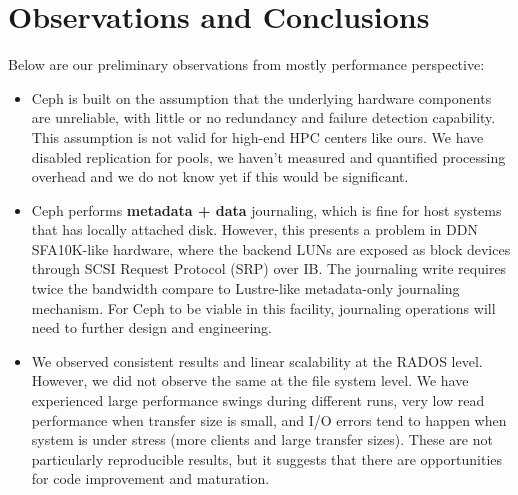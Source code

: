 \section{Observations and Conclusions}

Below are our preliminary observations from mostly performance perspective:

\begin{itemize}

  \item Ceph is built on the assumption that the underlying hardware components
are unreliable, with little or no redundancy and failure detection capability.
This assumption is not valid for high-end HPC centers like ours. We have
disabled replication for pools, we haven't measured and quantified
processing overhead and we do not know yet if this would be significant.

  \item Ceph performs \textbf{metadata + data} journaling, which is fine for
host systems that has locally attached disk. However, this presents a problem
in DDN SFA10K-like hardware, where the backend LUNs are exposed as block
devices through SCSI Request Protocol (SRP) over IB. The journaling write
requires twice the bandwidth compare to Lustre-like metadata-only journaling
mechanism. For Ceph to be viable in this facility, journaling operations will
need to further design and engineering.

  \item We observed consistent results and linear scalability at the RADOS
level. However, we did not observe the same at the file system level. We have
experienced large performance swings during different runs, very low read
performance when transfer size is small, and I/O errors tend to happen when
system is under stress (more clients and large transfer sizes). These are not
particularly reproducible results, but it suggests that there are opportunities
for code improvement and maturation.

\end{itemize}

